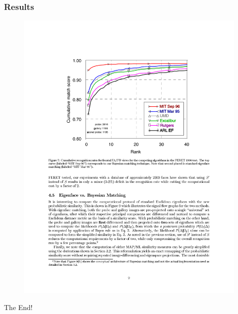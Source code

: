\documentclass{beamer}
\begin{document}
\begin{frame}
\frametitle{Results}
\begin{figure}[H]
\centering
\includegraphics[height=\textheight, trim=1.6in 4.9in 1.6in 1.4in, clip]{Moghaddam11}
\end{figure}
\end{frame}

\begin{frame}
\centerline{The End!}
\end{frame}

\end{document}
